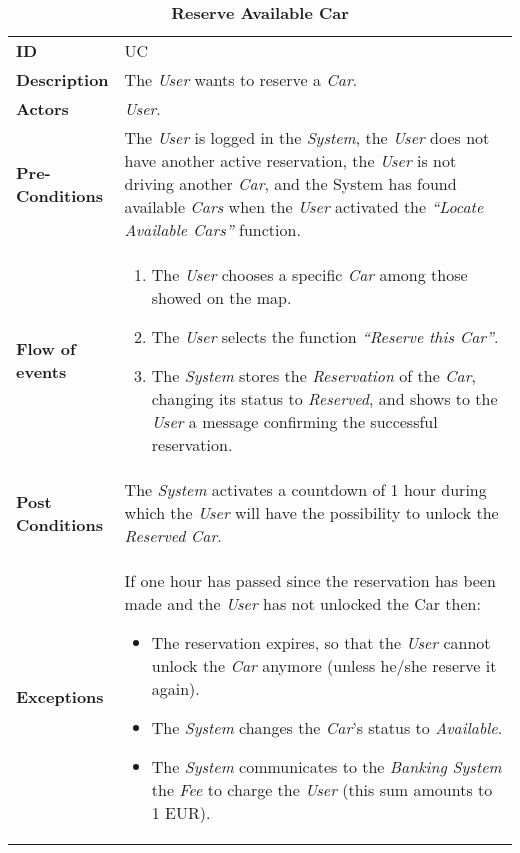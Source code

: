 \begin{longtable}{|p{0.2\linewidth} | p{0.8\linewidth}|}
	\captionsetup{labelformat=empty} %
	\caption{\textbf{Reserve Available Car}} %
	\label{UC_ReserveCar}%
	\\ \hline %
	
	\textbf{ID} & UC\theUseCaseIdCounter \\ \hline
	\textbf{Description} & The \emph{User} wants to reserve a \emph{Car}. \\ \hline
	\textbf{Actors} & \emph{User}.\\ \hline
	\textbf{Pre-Conditions} & The \emph{User} is logged in the \emph{System}, the \emph{User} does not have another active reservation, the \emph{User} is not driving another \emph{Car}, and the System has found available \emph{Cars} when the \emph{User} activated the \textit{\textquotedblleft{Locate Available Cars}\textquotedblright} function. \\ \hline
	\textbf{Flow of events} & 
	\begin{enumerate}
		\item The \emph{User} chooses a specific \emph{Car} among those showed on the map.
		\item The \emph{User} selects the function \textit{\textquotedblleft{Reserve this Car}\textquotedblright}.
		\item The \emph{System} stores the \emph{Reservation} of the \emph{Car}, changing its status to \emph{Reserved}, and shows to the \emph{User} a message confirming the successful reservation.
	\end{enumerate}	 \\ \hline
	\textbf{Post Conditions} & The \emph{System} activates a countdown of 1 hour during which the \emph{User} will have the possibility to unlock the \emph{Reserved} \emph{Car}. \\ \hline
	\textbf{Exceptions} & If one hour has passed since the reservation has been made and the \emph{User} has not unlocked the Car then:
		\begin{itemize}
		\item The reservation expires, so that the \emph{User} cannot unlock the \emph{Car} anymore (unless he/she reserve it again).
		\item The \emph{System} changes the \emph{Car}'s status to \emph{Available}.
		\item The \emph{System} communicates to the \emph{Banking System} the \emph{Fee} to charge the \emph{User} (this sum amounts to 1 EUR).

\end{itemize}
\end{longtable}
